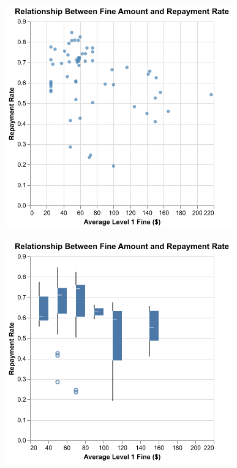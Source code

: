 \documentclass[
  letterpaper,
  DIV=11,
  numbers=noendperiod]{scrartcl}
\begin{document}
\includegraphics{ps2_answers_files/figure-pdf/cell-21-output-1.png}

\includegraphics{ps2_answers_files/figure-pdf/cell-21-output-2.png}
\end{document}
